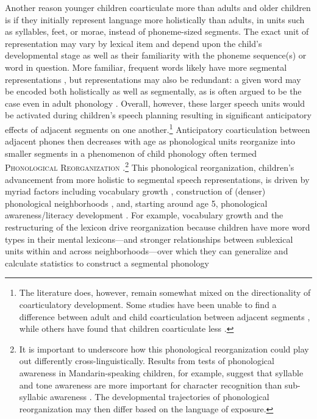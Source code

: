 \documentclass[a4paper,man,natbib,donotrepeattitle, apacite]{apa6}
\begin{document}
Another reason younger children coarticulate more than adults and older children is if they initially represent language more holistically than adults, in units such as syllables, feet, or morae, instead of phoneme-sized segments. The exact unit of representation may vary by lexical item and depend upon the child's developmental stage \cite{davisEmergenceDiscretePerceptualMotor2019} as well as their familiarity with the phoneme sequence(s) or word in question. More familiar, frequent words likely have more segmental representations \cite{edwardsInteractionVocabularySize2004}, but representations may also be redundant: a given word may be encoded both holistically as well as segmentally, as is often argued to be the case even in adult phonology \cite{pierrehumbertPhoneticDiversityStatistical2003}. Overall, however, these larger speech units would be activated during children’s speech planning resulting in significant anticipatory effects of adjacent segments on one another.\footnote{The literature does, however, remain somewhat mixed on the directionality of coarticulatory development. Some studies have been unable to find a difference between adult and child coarticulation between adjacent segments \cite{katzAnticipatoryCoarticulationSpeech1991,noirayDevelopmentMotorSynergies2013,serenoDevelopmentalAspectsLingual1987,zharkovaDynamicsVoicelessSibilant2018}, while others have found that children coarticulate less \cite{kentSegmentalOrganizationSpeech1983}.} Anticipatory coarticulation between adjacent phones then decreases with age as phonological units reorganize into smaller segments in a phenomenon of child phonology often termed \textsc{Phonological Reorganization}  \cite{goodellAcousticEvidenceDevelopment1992,metsalaYoungChildrenPhonological1999,metsalaYoungChildrenPhonological1999,nittrouerEmergencePhoneticSegments1989,nittrouerHowChildrenLearn1996,noiraySpokenLanguageDevelopment2019,noirayHowChildrenOrganize2018,redfordGrammaticalWordProduction2018,zharkovaCoarticulationIndicatorSpeech2011}.\footnote{It is important to underscore how this phonological reorganization could play out differently cross-linguistically. Results from tests of phonological awareness in Mandarin-speaking children, for example, suggest that syllable and tone awareness are more important for character recognition than sub-syllabic awareness \cite{mcbride-changLevelsPhonologicalAwareness2004,shuPhonologicalAwarenessYoung2008a}. The developmental trajectories of phonological reorganization may then differ based on the language of exposure.} This phonological reorganization, children's advancement from more holistic to segmental speech representations, is driven by myriad factors including vocabulary growth \cite{metsalaSpokenVocabularyGrowth1998}, construction of (denser) phonological neighborhoods \cite{storkelInfluencePartwordPhonotactic2011}, and, starting around age 5, phonological awareness/literacy development \cite{metsalaYoungChildrenPhonological1999}. For example, vocabulary growth and the restructuring of the lexicon drive reorganization because children have more word types in their mental lexicons---and stronger relationships between sublexical units within and across neighborhoods---over which they can generalize and calculate statistics to construct a segmental phonology 
\end{document}
